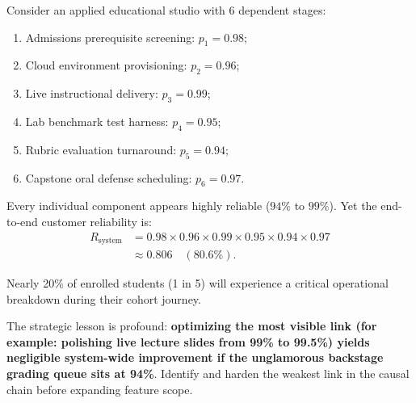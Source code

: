 Consider an applied educational studio with 6 dependent stages:
\begin{enumerate}
    \item Admissions prerequisite screening: $p_1 = 0.98$;
    \item Cloud environment provisioning: $p_2 = 0.96$;
    \item Live instructional delivery: $p_3 = 0.99$;
    \item Lab benchmark test harness: $p_4 = 0.95$;
    \item Rubric evaluation turnaround: $p_5 = 0.94$;
    \item Capstone oral defense scheduling: $p_6 = 0.97$.
\end{enumerate}

Every individual component appears highly reliable ($94\%$ to $99\%$). Yet the end-to-end customer reliability is:
\begin{equation}
\begin{aligned}
R_{\text{system}} &= 0.98 \times 0.96 \times 0.99 \times 0.95 \times 0.94 \times 0.97 \\
&\approx \mathbf{0.806}\quad (80.6\%).
\end{aligned}
\end{equation}

Nearly 20\% of enrolled students (1 in 5) will experience a critical operational breakdown during their cohort journey.

The strategic lesson is profound: \textbf{optimizing the most visible link (for example: polishing live lecture slides from 99\% to 99.5\%) yields negligible system-wide improvement if the unglamorous backstage grading queue sits at 94\%}. Identify and harden the weakest link in the causal chain before expanding feature scope.
